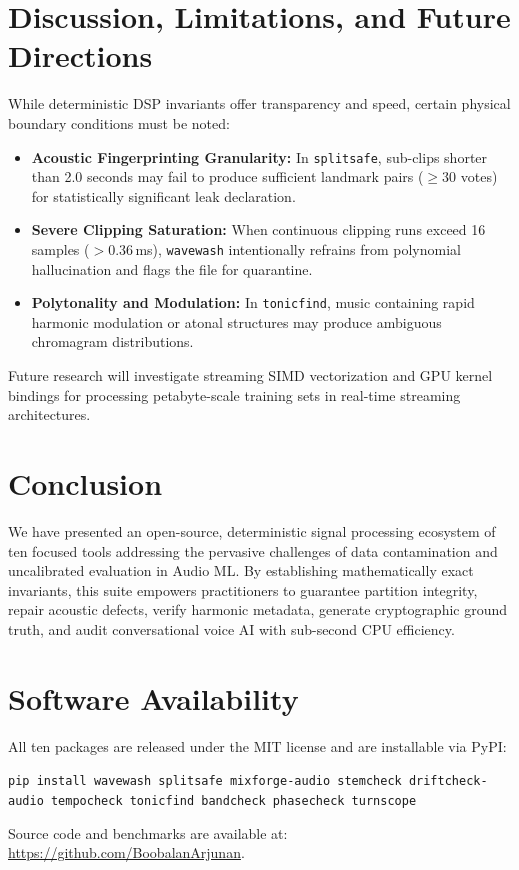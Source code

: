 \documentclass[10pt,journal,compsoc]{IEEEtran}
\begin{document}
\section{Discussion, Limitations, and Future Directions}
While deterministic DSP invariants offer transparency and speed, certain physical boundary conditions must be noted:
\begin{itemize}
    \item \textbf{Acoustic Fingerprinting Granularity:} In \texttt{splitsafe}, sub-clips shorter than 2.0 seconds may fail to produce sufficient landmark pairs ($\ge 30$ votes) for statistically significant leak declaration.
    \item \textbf{Severe Clipping Saturation:} When continuous clipping runs exceed 16 samples ($>0.36$\,ms), \texttt{wavewash} intentionally refrains from polynomial hallucination and flags the file for quarantine.
    \item \textbf{Polytonality and Modulation:} In \texttt{tonicfind}, music containing rapid harmonic modulation or atonal structures may produce ambiguous chromagram distributions.
\end{itemize}
Future research will investigate streaming SIMD vectorization and GPU kernel bindings for processing petabyte-scale training sets in real-time streaming architectures.

\section{Conclusion}
We have presented an open-source, deterministic signal processing ecosystem of ten focused tools addressing the pervasive challenges of data contamination and uncalibrated evaluation in Audio ML. By establishing mathematically exact invariants, this suite empowers practitioners to guarantee partition integrity, repair acoustic defects, verify harmonic metadata, generate cryptographic ground truth, and audit conversational voice AI with sub-second CPU efficiency.

\section*{Software Availability}
All ten packages are released under the MIT license and are installable via PyPI:
\begin{center}
\texttt{pip install wavewash splitsafe mixforge-audio stemcheck driftcheck-audio tempocheck tonicfind bandcheck phasecheck turnscope}
\end{center}
Source code and benchmarks are available at: \url{https://github.com/BoobalanArjunan}.
\end{document}
